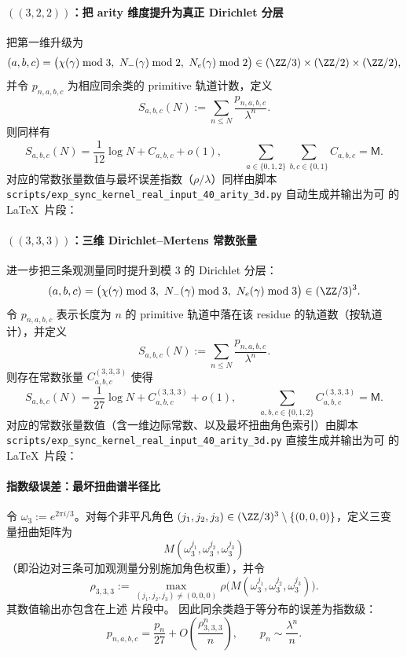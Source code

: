 \paragraph{\texorpdfstring{$((3,2,2))$}{(3,2,2)}：把 arity 维度提升为真正 Dirichlet 分层}
把第一维升级为
$$
(a,b,c)=\bigl(\chi(\gamma)\bmod 3,\ N_-(\gamma)\bmod 2,\ N_e(\gamma)\bmod 2\bigr)\in(\ZZ/3)\times(\ZZ/2)\times(\ZZ/2),
$$
并令 $p_{n,a,b,c}$ 为相应同余类的 primitive 轨道计数，定义
$$
S_{a,b,c}(N):=\sum_{n\le N}\frac{p_{n,a,b,c}}{\lambda^n}.
$$
则同样有
$$
S_{a,b,c}(N)=\frac{1}{12}\log N + C_{a,b,c}+o(1),
\qquad
\sum_{a\in\{0,1,2\}}\sum_{b,c\in\{0,1\}}C_{a,b,c}=\mathsf{M}.
$$
对应的常数张量数值与最坏误差指数（$\rho/\lambda$）同样由脚本
\texttt{scripts/exp\_sync\_kernel\_real\_input\_40\_arity\_3d.py}
自动生成并输出为可 \verb|| 的 \LaTeX\ 片段：


\paragraph{\texorpdfstring{$((3,3,3))$}{(3,3,3)}：三维 Dirichlet--Mertens 常数张量}
进一步把三条观测量同时提升到模 $3$ 的 Dirichlet 分层：
$$
(a,b,c)=\bigl(\chi(\gamma)\bmod 3,\ N_-(\gamma)\bmod 3,\ N_e(\gamma)\bmod 3\bigr)\in(\ZZ/3)^3.
$$
令 $p_{n,a,b,c}$ 表示长度为 $n$ 的 primitive 轨道中落在该 residue 的轨道数（按轨道计），并定义
$$
S_{a,b,c}(N):=\sum_{n\le N}\frac{p_{n,a,b,c}}{\lambda^n}.
$$
则存在常数张量 $C^{(3,3,3)}_{a,b,c}$ 使得
$$
S_{a,b,c}(N)=\frac{1}{27}\log N + C^{(3,3,3)}_{a,b,c}+o(1),
\qquad
\sum_{a,b,c\in\{0,1,2\}} C^{(3,3,3)}_{a,b,c}=\mathsf{M}.
$$
对应的常数张量数值（含一维边际常数、以及最坏扭曲角色索引）由脚本
\texttt{scripts/exp\_sync\_kernel\_real\_input\_40\_arity\_3d.py}
直接生成并输出为可 \verb|| 的 \LaTeX\ 片段：


\paragraph{指数级误差：最坏扭曲谱半径比}
令 $\omega_3:=e^{2\pi i/3}$。对每个非平凡角色 $(j_1,j_2,j_3)\in(\ZZ/3)^3\setminus\{(0,0,0)\}$，定义三变量扭曲矩阵为
$$
M(\omega_3^{j_1},\omega_3^{j_2},\omega_3^{j_3})
$$
（即沿边对三条可加观测量分别施加角色权重），并令
$$
\rho_{3,3,3}
:=
\max_{(j_1,j_2,j_3)\neq(0,0,0)}
\rho\bigl(M(\omega_3^{j_1},\omega_3^{j_2},\omega_3^{j_3})\bigr).
$$
其数值输出亦包含在上述 \verb|| 片段中。
因此同余类趋于等分布的误差为指数级：
$$
p_{n,a,b,c}=\frac{p_n}{27}+O\!\left(\frac{\rho_{3,3,3}^n}{n}\right),
\qquad
p_n\sim\frac{\lambda^n}{n}.
$$

